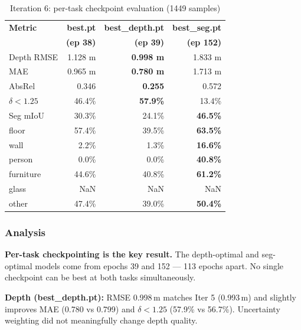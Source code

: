 \documentclass[11pt,a4paper]{article}
\begin{document}
\begin{table}[h]
\centering
\caption{Iteration 6: per-task checkpoint evaluation (1449 samples)}
\label{tab:iter6-eval}
\begin{tabular}{lrrr}
\toprule
\textbf{Metric} & \textbf{best.pt} & \textbf{best\_depth.pt} & \textbf{best\_seg.pt} \\
                 & \textbf{(ep 38)} & \textbf{(ep 39)} & \textbf{(ep 152)} \\
\midrule
Depth RMSE       & 1.128 m & \textcolor{improved}{\textbf{0.998 m}} & 1.833 m \\
MAE              & 0.965 m & \textcolor{improved}{\textbf{0.780 m}} & 1.713 m \\
AbsRel           & 0.346   & \textcolor{improved}{\textbf{0.255}}   & 0.572 \\
$\delta < 1.25$  & 46.4\%  & \textcolor{improved}{\textbf{57.9\%}}  & 13.4\% \\
\midrule
Seg mIoU         & 30.3\%  & 24.1\%  & \textcolor{improved}{\textbf{46.5\%}} \\
\quad floor      & 57.4\%  & 39.5\%  & \textcolor{improved}{\textbf{63.5\%}} \\
\quad wall       & 2.2\%   & 1.3\%   & \textcolor{improved}{\textbf{16.6\%}} \\
\quad person     & 0.0\%   & 0.0\%   & \textcolor{improved}{\textbf{40.8\%}} \\
\quad furniture  & 44.6\%  & 40.8\%  & \textcolor{improved}{\textbf{61.2\%}} \\
\quad glass      & NaN     & NaN     & NaN \\
\quad other      & 47.4\%  & 39.0\%  & \textcolor{improved}{\textbf{50.4\%}} \\
\bottomrule
\end{tabular}
\end{table}

\subsubsection{Analysis}

\textbf{Per-task checkpointing is the key result.} The depth-optimal and
seg-optimal models come from epochs 39 and 152 --- 113 epochs apart.
No single checkpoint can be best at both tasks simultaneously.

\textbf{Depth (best\_depth.pt):} RMSE 0.998\,m matches Iter 5 (0.993\,m)
and slightly improves MAE (0.780 vs 0.799) and $\delta < 1.25$
(57.9\% vs 56.7\%). Uncertainty weighting did not meaningfully change
depth quality.
\end{document}
